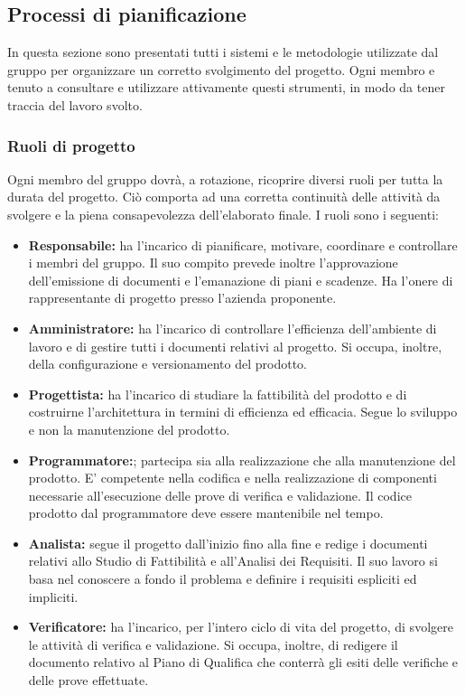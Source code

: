 \subsection{ Processi di pianificazione}
In questa sezione sono presentati tutti i sistemi e le metodologie utilizzate dal gruppo per organizzare un corretto svolgimento del progetto.
Ogni  membro e  tenuto  a  consultare  e utilizzare  attivamente  questi strumenti,  in  modo  da  tener traccia del lavoro svolto.
\subsubsection{Ruoli di progetto}
Ogni membro del gruppo dovrà, a rotazione, ricoprire diversi ruoli per tutta la durata del progetto. Ciò comporta ad una corretta continuità delle attività da svolgere e la piena consapevolezza dell’elaborato finale.
I ruoli sono i seguenti:
\begin{itemize}
\item \textbf{Responsabile:} ha l'incarico di pianificare, motivare, coordinare e controllare i membri del gruppo.
Il suo compito prevede inoltre l'approvazione dell'emissione di documenti e l'emanazione di piani e scadenze.
Ha l'onere di rappresentante di progetto presso l'azienda proponente.
\item \textbf{Amministratore:} ha l'incarico di controllare l'efficienza dell'ambiente di lavoro e di gestire tutti i documenti relativi al progetto. Si occupa, inoltre, della configurazione e versionamento del prodotto.
\item \textbf{Progettista:} ha l'incarico di studiare la fattibilità del prodotto e di costruirne l'architettura in termini di efficienza ed efficacia. Segue lo sviluppo e non la manutenzione del prodotto.
\item \textbf{Programmatore:}; partecipa sia alla realizzazione che alla manutenzione del prodotto. E' competente nella codifica e nella realizzazione di componenti necessarie all’esecuzione delle prove di verifica e validazione. Il codice prodotto dal programmatore deve essere mantenibile nel tempo.
\item \textbf{Analista:} segue il progetto dall'inizio fino alla fine e redige  i documenti relativi allo Studio di Fattibilità e all'Analisi dei Requisiti. Il suo lavoro si basa nel conoscere a fondo il problema e definire i requisiti espliciti ed impliciti.
\item \textbf{Verificatore:} ha l'incarico, per l'intero ciclo di vita del progetto, di svolgere le attività di verifica e validazione. Si occupa, inoltre, di redigere il documento relativo al Piano di Qualifica che conterrà gli esiti delle verifiche e delle prove effettuate.
\end{itemize}
